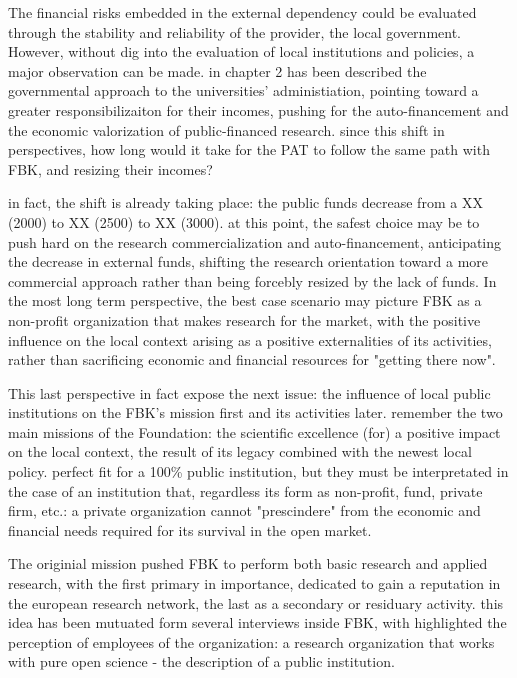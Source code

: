 The financial risks embedded in the external dependency could be evaluated through the stability and reliability of the provider, the local government. However, without dig into the evaluation of local institutions and policies, a major observation can be made. in chapter 2 has been described the governmental approach to the universities' administiation, pointing toward a greater responsibilizaiton for their incomes, pushing for the auto-financement and the economic valorization of public-financed research. since this shift in perspectives, how long would it take for the PAT to follow the same path with FBK, and resizing their incomes?

in fact, the shift is already taking place: the public funds decrease from a XX (2000) to XX (2500) to XX (3000). at this point, the safest choice may be to push hard on the research commercialization and auto-financement, anticipating the decrease in external funds, shifting the research orientation toward a more commercial approach rather than being forcebly resized by the lack of funds. In the most long term perspective, the best case scenario may picture FBK as a non-profit organization that makes research for the market, with the positive influence on the local context arising as a positive externalities of its activities, rather than sacrificing economic and financial resources for "getting there now".

This last perspective in fact expose the next issue: the influence of local public institutions on the FBK's mission first and its activities later. remember the two main missions of the Foundation: the scientific excellence (for) a positive impact on the local context, the result of its legacy combined with the newest local policy. perfect fit for a 100\% public institution, but they must be interpretated in the case of an institution that, regardless its form as non-profit, fund, private firm, etc.: a private organization cannot "prescindere" from the economic and financial needs required for its survival in the open market. 

The originial mission pushed FBK to perform both basic research and applied research, with the first primary in importance, dedicated to gain a reputation in the european research network, the last as a secondary or residuary activity. this idea has been mutuated form several interviews inside FBK, with highlighted the perception of employees of the organization: a research organization that works with pure open science - the description of a public institution. 

